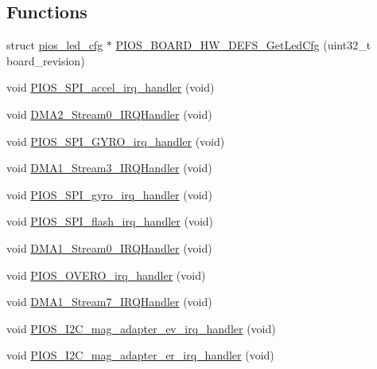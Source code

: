 \subsection*{\-Functions}
\begin{DoxyCompactItemize}
\item 
struct \hyperlink{structpios__led__cfg}{pios\-\_\-led\-\_\-cfg} $\ast$ \hyperlink{group___revolution_gafb76ae90816003eabf1d90feff7b1a52}{\-P\-I\-O\-S\-\_\-\-B\-O\-A\-R\-D\-\_\-\-H\-W\-\_\-\-D\-E\-F\-S\-\_\-\-Get\-Led\-Cfg} (uint32\-\_\-t board\-\_\-revision)
\item 
void \hyperlink{group___revolution_ga63d09d362d824819ac0ec8162ca337f9}{\-P\-I\-O\-S\-\_\-\-S\-P\-I\-\_\-accel\-\_\-irq\-\_\-handler} (void)
\item 
void \hyperlink{group___revolution_gaaf6ce196dde98712e1223b99766e06c0}{\-D\-M\-A2\-\_\-\-Stream0\-\_\-\-I\-R\-Q\-Handler} (void)
\item 
void \hyperlink{group___revolution_gad1fb9fec446e89bf7090083a927e4324}{\-P\-I\-O\-S\-\_\-\-S\-P\-I\-\_\-\-G\-Y\-R\-O\-\_\-irq\-\_\-handler} (void)
\item 
void \hyperlink{group___revolution_ga51d485393cf37043623c8bd0abae12a1}{\-D\-M\-A1\-\_\-\-Stream3\-\_\-\-I\-R\-Q\-Handler} (void)
\item 
void \hyperlink{group___revolution_ga6f05a1487b9b8de794d06f0e6241e983}{\-P\-I\-O\-S\-\_\-\-S\-P\-I\-\_\-gyro\-\_\-irq\-\_\-handler} (void)
\item 
void \hyperlink{group___revolution_ga9105498d0634ecb94bb3a816f4fe28c9}{\-P\-I\-O\-S\-\_\-\-S\-P\-I\-\_\-flash\-\_\-irq\-\_\-handler} (void)
\item 
void \hyperlink{group___revolution_ga1b70a4441662b1d6548e803499da414f}{\-D\-M\-A1\-\_\-\-Stream0\-\_\-\-I\-R\-Q\-Handler} (void)
\item 
void \hyperlink{group___revolution_gab32b7424dc522e8da0bfb7cf20fbd91e}{\-P\-I\-O\-S\-\_\-\-O\-V\-E\-R\-O\-\_\-irq\-\_\-handler} (void)
\item 
void \hyperlink{group___revolution_gae81787590524971351490705554cc351}{\-D\-M\-A1\-\_\-\-Stream7\-\_\-\-I\-R\-Q\-Handler} (void)
\item 
void \hyperlink{group___revolution_ga8bc8a2d9cb0e9e1bc16b89376b71fc1a}{\-P\-I\-O\-S\-\_\-\-I2\-C\-\_\-mag\-\_\-adapter\-\_\-ev\-\_\-irq\-\_\-handler} (void)
\item 
void \hyperlink{group___revolution_ga674be5f45a070b80f972c0e9a4f30a97}{\-P\-I\-O\-S\-\_\-\-I2\-C\-\_\-mag\-\_\-adapter\-\_\-er\-\_\-irq\-\_\-handler} (void)

\end{DoxyCompactItemize}
